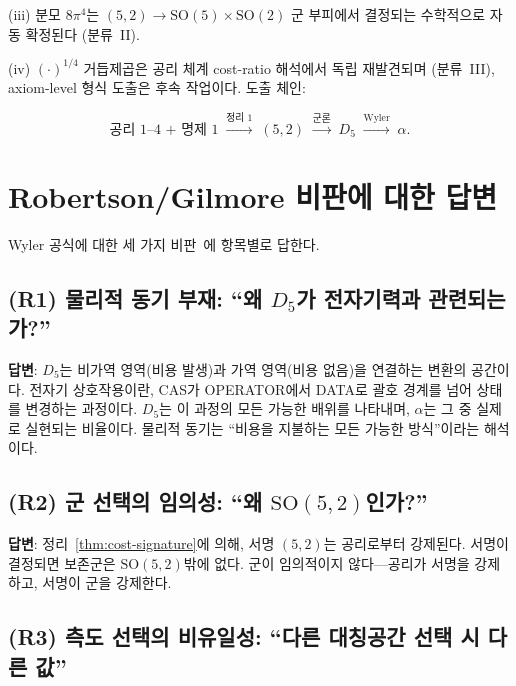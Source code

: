 \documentclass[entropy,article,submit,pdftex,oneauthor]{Definitions/mdpi}
\begin{document}
(iii) 분모 $8\pi^4$는 $(5,2) \to \mathrm{SO}(5)\times\mathrm{SO}(2)$ 군 부피에서 결정되는 수학적으로 자동 확정된다 (분류~II).

(iv) $(\cdot)^{1/4}$ 거듭제곱은 공리 체계 cost-ratio 해석에서 독립 재발견되며 (분류~III), axiom-level 형식 도출은 후속 작업이다. 도출 체인:
\begin{linenomath}
\begin{equation}
\text{공리~1--4 + 명제~1} \;\xrightarrow{\text{정리~1}}\; (5,2) \;\xrightarrow{\text{군론}}\; D_5 \;\xrightarrow{\text{Wyler}}\; \alpha.
\end{equation}
\end{linenomath}

\section{Robertson/Gilmore 비판에 대한 답변}
\label{sec:robertson}

Wyler 공식에 대한 세 가지 비판~\cite{robertson1971,gilmore1972}에 항목별로 답한다.

\subsection{(R1) 물리적 동기 부재: ``왜 $D_5$가 전자기력과 관련되는가?''~\cite{robertson1971}}

\textbf{답변}: $D_5$는 비가역 영역(비용 발생)과 가역 영역(비용 없음)을 연결하는 변환의 공간이다. 전자기 상호작용이란, CAS가 OPERATOR에서 DATA로 괄호 경계를 넘어 상태를 변경하는 과정이다. $D_5$는 이 과정의 모든 가능한 배위를 나타내며, $\alpha$는 그 중 실제로 실현되는 비율이다. 물리적 동기는 ``비용을 지불하는 모든 가능한 방식''이라는 해석이다.

\subsection{(R2) 군 선택의 임의성: ``왜 $\mathrm{SO}(5,2)$인가?''~\cite{robertson1971}}

\textbf{답변}: 정리~\ref{thm:cost-signature}에 의해, 서명 $(5,2)$는 공리로부터 강제된다. 서명이 결정되면 보존군은 $\mathrm{SO}(5,2)$밖에 없다. 군이 임의적이지 않다---공리가 서명을 강제하고, 서명이 군을 강제한다.

\subsection{(R3) 측도 선택의 비유일성: ``다른 대칭공간 선택 시 다른 값''~\cite{gilmore1972}}
\end{document}
